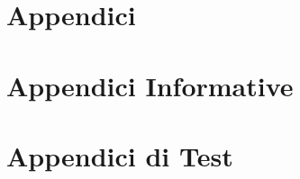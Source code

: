 	

	

	




\appendix

\part{Appendici}

	

	

\part{Appendici Informative}

	

	

\part{Appendici di Test}

	
	
	

	

	

	




